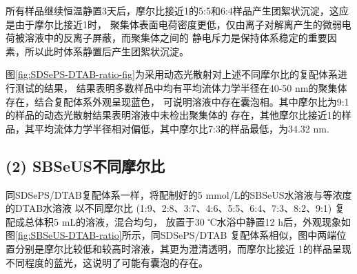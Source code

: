 \documentclass[bachelor,fandolfonts,replaceperiod]{jnuthesis}
\begin{document}
    所有样品继续恒温静置3天后，摩尔比接近1的5:5和6:4样品产生团絮状沉淀，这应是由于摩尔比接近1时，
    聚集体表面电荷密度更低，仅由离子对解离产生的微弱电荷被溶液中的反离子屏蔽，而聚集体之间的
    静电斥力是保持体系稳定的重要因素，所以此时体系静置后产生团絮状沉淀。
    
    图\ref{fig:SDSePS-DTAB-ratio-fig}为采用动态光散射对上述不同摩尔比的复配体系进行测试的结果，
    结果表明多数样品中均有平均流体力学半径在40-50 nm的聚集体存在，结合复配体系外观呈现蓝色，
    可说明溶液中存在囊泡相。其中摩尔比为9:1的样品的动态光散射结果表明溶液中未检出聚集体的
    存在，其他摩尔比接近1的样品，其平均流体力学半径相对偏低，其中摩尔比7:3的样品最低，为34.32 nm.

    \subsection*{(2) SBSeUS不同摩尔比}
    同SDSePS/DTAB复配体系一样，将配制好的5 mmol/L的SBSeUS水溶液与等浓度的DTAB水溶液
    以不同摩尔比 (1:9、2:8、3:7、4:6、5:5、6:4、7:3、8:2、9:1) 复配成总体积5 mL的溶液，混合均匀，
    放置于30 ℃水浴中静置12 h后，外观现象如图\ref{fig:SBSeUS-DTAB-ratio}所示，同SDSePS/DTAB
    复配体系相似，图中两端位置分别是摩尔比较低和较高时溶液，其更为澄清透明，而摩尔比接近
    1的样品呈现不同程度的蓝光，这说明了可能有囊泡的存在。
\end{document}
